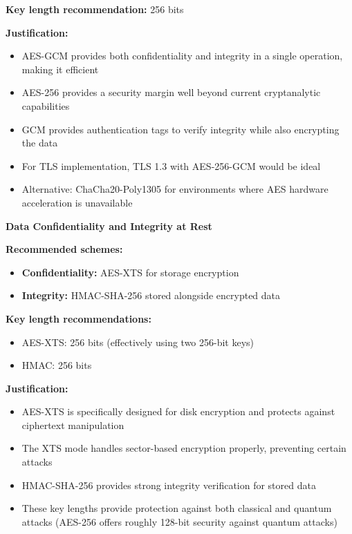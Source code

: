 \documentclass{article}
\begin{document}
\begin{enumerate}[label=\textbf{Task \arabic*:}]
\begin{tcolorbox}
		\noindent\textbf{Key length recommendation:} 256 bits
		
		\noindent\textbf{Justification:}
		\begin{itemize}
			\item AES-GCM provides both confidentiality and integrity in a single operation, making it efficient
			\item AES-256 provides a security margin well beyond current cryptanalytic capabilities
			\item GCM provides authentication tags to verify integrity while also encrypting the data
			\item For TLS implementation, TLS 1.3 with AES-256-GCM would be ideal
			\item Alternative: ChaCha20-Poly1305 for environments where AES hardware acceleration is unavailable
		\end{itemize}
		
		\bigskip
		\noindent\textbf{\large Data Confidentiality and Integrity at Rest}
		
		\noindent\textbf{Recommended schemes:}
		\begin{itemize}
			\item \textbf{Confidentiality:} AES-XTS for storage encryption
			\item \textbf{Integrity:} HMAC-SHA-256 stored alongside encrypted data
		\end{itemize}
		
		\noindent\textbf{Key length recommendations:}
		\begin{itemize}
			\item AES-XTS: 256 bits (effectively using two 256-bit keys)
			\item HMAC: 256 bits
		\end{itemize}
		
		\noindent\textbf{Justification:}
		\begin{itemize}
			\item AES-XTS is specifically designed for disk encryption and protects against ciphertext manipulation
			\item The XTS mode handles sector-based encryption properly, preventing certain attacks
			\item HMAC-SHA-256 provides strong integrity verification for stored data
			\item These key lengths provide protection against both classical and quantum attacks (AES-256 offers roughly 128-bit security against quantum attacks)
		\end{itemize}
		

\end{tcolorbox}
\end{enumerate}
\end{document}
